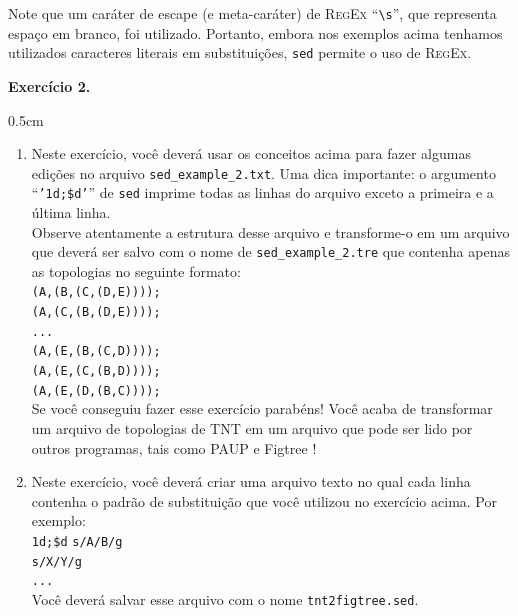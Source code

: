 \begin{refsection}
Note que um caráter de escape (e meta-caráter) de \textsc{RegEx} ``\texttt{\textbackslash s}'', que representa espaço em branco, foi utilizado. Portanto, embora nos exemplos acima tenhamos utilizados caracteres literais em substituições, \texttt{sed} permite o uso de \textsc{RegEx}.

\begin{blackBlock}{\textbf{Exercício 2.}}\label{tut2:ex:2.\arabic{ex}}

\begin {myindentpar}{0.5cm}
\begin{enumerate}[\itshape i.]
 \item{Neste exercício, você deverá usar os conceitos acima para fazer algumas edições no arquivo \texttt{sed\_example\_2.txt}. Uma dica importante: o argumento ``\texttt{'1d;\$d'}'' de \texttt{sed} imprime todas as linhas do arquivo exceto a primeira e a última linha. }\label{tut2:sed:address:ex1}\\

Observe atentamente a estrutura desse arquivo e transforme-o em um arquivo que deverá ser salvo com o nome de  \texttt{sed\_example\_2.tre} que contenha apenas as topologias no seguinte formato:\\
\texttt{(A,(B,(C,(D,E))));}\\
\texttt{(A,(C,(B,(D,E))));}\\
\texttt{...}\\
\texttt{(A,(E,(B,(C,D))));}\\
\texttt{(A,(E,(C,(B,D))));}\\
\texttt{(A,(E,(D,(B,C))));}\\

Se você conseguiu fazer esse exercício parabéns! Você acaba de transformar um arquivo de topologias de TNT em um arquivo que pode ser lido por outros programas, tais como PAUP \parencite{Swofford_2003} e Figtree \parencite{Rambaut_2006}!\\

 \item{Neste exercício, você deverá criar uma arquivo texto no qual cada linha contenha o padrão de substituição que você utilizou no exercício acima. Por exemplo:}\\
\texttt{1d;\$d}
\texttt{s/A/B/g}\\
\texttt{s/X/Y/g}\\
\texttt{...}\\

Você deverá salvar esse arquivo com o nome \texttt{tnt2figtree.sed}.\\


\end{enumerate}
\end{myindentpar}
\end{blackBlock}
\end{refsection}
